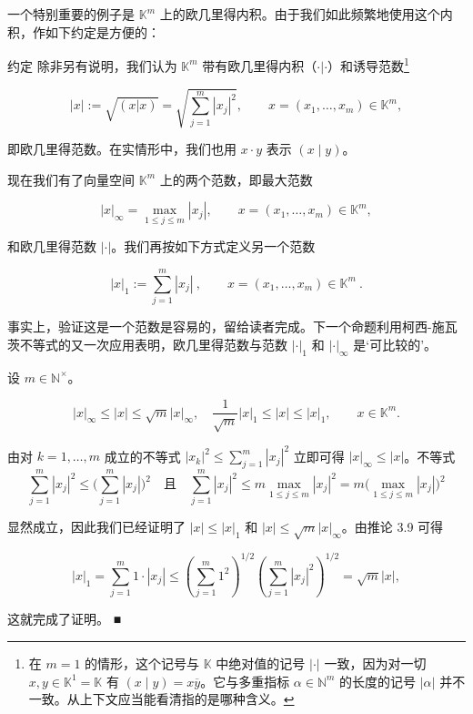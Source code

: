 一个特别重要的例子是 $ \mathbb{K}^m $ 上的欧几里得内积。由于我们如此频繁地使用这个内积，作如下约定是方便的：

约定 除非另有说明，我们认为 $ \mathbb{K}^m $ 带有欧几里得内积（$ \cdot|\cdot $）和诱导范数\footnote{在 $m=1$ 的情形，这个记号与 $\mathbb K$ 中绝对值的记号 $|\cdot|$ 一致，因为对一切 $x,y\in\mathbb K^{1}=\mathbb K$ 有 $(x\mid y)=x\overline{y}$。它与多重指标 $\alpha\in\mathbb N^{m}$ 的长度的记号 $|\alpha|$ 并不一致。从上下文应当能看清指的是哪种含义。}

\[
\left|x\right|:=\sqrt{\left(x\left|x\right.\right)}=\sqrt{\sum_{j=1}^{m}\left|x_{j}\right|^{2}},\qquad x=\left(x_{1},\ldots,x_{m}\right)\in\mathbb{K}^{m},
\]

即欧几里得范数。在实情形中，我们也用 $ x \cdot y $ 表示 $ (x \mid y) $。

现在我们有了向量空间 $ \mathbb{K}^m $ 上的两个范数，即最大范数

\[
|x|_{\infty}=\max_{1\leq j\leq m}|x_{j}|,\qquad x=(x_{1},\ldots,x_{m})\in\mathbb{K}^{m},
\]

和欧几里得范数 $ |\cdot| $。我们再按如下方式定义另一个范数

\[
|x|_{1}:=\sum_{j=1}^{m}|x_{j}|~,\qquad x=(x_{1},\ldots,x_{m})\in\mathbb{K}^{m}~.
\]

事实上，验证这是一个范数是容易的，留给读者完成。下一个命题利用柯西-施瓦茨不等式的又一次应用表明，欧几里得范数与范数 $ |\cdot|_1 $ 和 $ |\cdot|_{\infty} $ 是‘可比较的’。

\begin{proposition}

设 $ m \in \mathbb{N}^\times $。

\[
|x|_{\infty}\leq|x|\leq\sqrt{m}\left|x\right|_{\infty},\quad\frac{1}{\sqrt{m}}\left|x\right|_{1}\leq\left|x\right|\leq\left|x\right|_{1},\qquad x\in\mathbb{K}^{m}.
\]

\proofhead
由对 $ k = 1, \ldots, m $ 成立的不等式 $ |x_k|^2 \leq \sum_{j=1}^m |x_j|^2 $ 立即可得 $ |x|_{\infty} \leq |x| $。不等式
\[
\sum_{j=1}^{m}\left|x_{j}\right|^{2}\leq\Big(\sum_{j=1}^{m}\left|x_{j}\right|\Big)^{2}\quad\text{且}\quad\sum_{j=1}^{m}\left|x_{j}\right|^{2}\leq m\max_{1\leq j\leq m}\left|x_{j}\right|^{2}=m\big(\max_{1\leq j\leq m}\left|x_{j}\right|\big)^{2}
\]

显然成立，因此我们已经证明了 $ |x| \leq |x|_{1} $ 和 $ |x| \leq \sqrt{m} |x|_{\infty} $。由推论 3.9 可得

\[
\left|x\right|_{1}=\sum_{j=1}^{m}1\cdot\left|x_{j}\right|\leq\left(\sum_{j=1}^{m}1^{2}\right)^{1/2}\left(\sum_{j=1}^{m}\left|x_{j}\right|^{2}\right)^{1/2}=\sqrt{m}\left|x\right|,
\]

这就完成了证明。 ■

\end{proposition}

